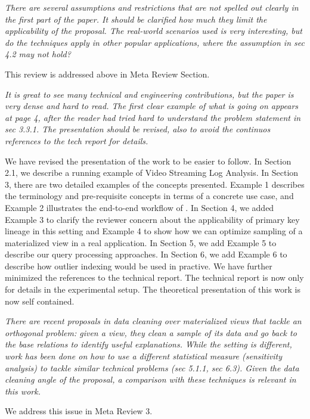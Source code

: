 \emph{There are several assumptions and restrictions that are not spelled out clearly in the first part of the paper. It should be clarified how much they limit the applicability of the proposal. The real-world scenarios used is very interesting, but do the techniques apply in other popular applications, where the assumption in sec 4.2 may not hold?}

This review is addressed above in Meta Review Section.

\vspace{1em}
\emph{It is great to see many technical and engineering contributions, but the paper is very dense and hard to read. The first clear example of what is going on appears at page 4, after the reader had tried hard to understand the problem statement in sec 3.3.1. The presentation should be revised, also to avoid the continuos references to the tech report for details.}

We have revised the presentation of the work to be easier to follow. In Section 2.1, we describe a running example of Video Streaming Log Analysis. In Section 3, there are two detailed examples of the concepts presented. Example 1 describes the terminology and pre-requisite concepts in terms of a concrete use case, and Example 2 illustrates the end-to-end workflow of \svc. In Section 4, we added Example 3 to clarify the reviewer concern about the applicability of primary key lineage in this setting and Example 4 to show how we can optimize sampling of a materialized view in a real application. In Section 5, we add Example 5 to describe our query processing approaches. In Section 6, we add Example 6 to describe how outlier indexing would be used in practive. We have further minimized the references to the technical report. The technical report is now only for details in the experimental setup. The theoretical presentation of this work is now self contained.

\vspace{1em}
\emph{There are recent proposals in data cleaning over materialized views that tackle an orthogonal problem: given a view, they clean a sample of its data and go back to the base relations to identify useful explanations. While the setting is different, work has been done on how to use a different statistical measure (sensitivity analysis) to tackle similar technical problems (sec 5.1.1, sec 6.3). Given the data cleaning angle of the proposal, a comparison with these techniques is relevant in this work.}

We address this issue in Meta Review 3.

